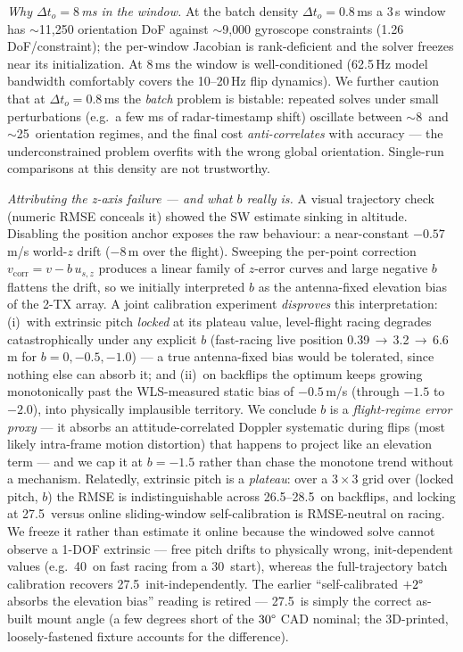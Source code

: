 \documentclass[conference]{IEEEtran}
\begin{document}
\emph{Why $\Delta t_o{=}8$\,ms in the window.}
At the batch density $\Delta t_o{=}0.8$\,ms a 3\,s window has
$\sim$11{,}250 orientation DoF against $\sim$9{,}000 gyroscope
constraints (1.26 DoF/constraint); the per-window Jacobian is
rank-deficient and the solver freezes near its initialization.
At 8\,ms the window is well-conditioned (62.5\,Hz model bandwidth
comfortably covers the 10--20\,Hz flip dynamics).
We further caution that at $\Delta t_o{=}0.8$\,ms the \emph{batch}
problem is bistable: repeated solves under small perturbations
(e.g.\ a few ms of radar-timestamp shift) oscillate between
$\sim$8\degree\ and $\sim$25\degree\ orientation regimes, and the
final cost \emph{anti-correlates} with accuracy --- the
underconstrained problem overfits with the wrong global orientation.
Single-run comparisons at this density are not trustworthy.

\emph{Attributing the z-axis failure --- and what $b$ really is.}
A visual trajectory check (numeric RMSE conceals it) showed the SW
estimate sinking in altitude.  Disabling the position anchor exposes
the raw behaviour: a near-constant $-0.57$\,m/s world-$z$ drift
($-8$\,m over the flight).  Sweeping the per-point correction
$v_{\mathrm{corr}} = v - b\,u_{s,z}$ produces a linear family of
$z$-error curves and large negative $b$ flattens the drift, so we
initially interpreted $b$ as the antenna-fixed elevation bias of the
2-TX array.  A joint calibration experiment \emph{disproves} this
interpretation: (i)~with extrinsic pitch \emph{locked} at its
plateau value, level-flight racing degrades catastrophically under
any explicit $b$ (fast-racing live position
0.39\,$\to$\,3.2\,$\to$\,6.6\,m for $b{=}0,-0.5,-1.0$) --- a true
antenna-fixed bias would be tolerated, since nothing else can absorb
it; and (ii)~on backflips the optimum keeps growing monotonically
past the WLS-measured static bias of $-0.5$\,m/s (through $-1.5$
to $-2.0$), into physically implausible territory.
We conclude $b$ is a \emph{flight-regime error proxy} --- it absorbs
an attitude-correlated Doppler systematic during flips (most likely
intra-frame motion distortion) that happens to project like an
elevation term --- and we cap it at $b{=}{-}1.5$ rather than chase
the monotone trend without a mechanism.
Relatedly, extrinsic pitch is a \emph{plateau}: over a $3{\times}3$ grid
over (locked pitch, $b$) the RMSE is indistinguishable across
26.5--28.5\degree\ on backflips, and locking at 27.5\degree\ versus
online sliding-window self-calibration is RMSE-neutral on racing.  We
freeze it rather than estimate it online because the windowed solve
cannot observe a 1-DOF extrinsic --- free pitch drifts to physically
wrong, init-dependent values (e.g.\ 40\degree\ on fast racing from a
30\degree\ start), whereas the full-trajectory batch calibration
recovers 27.5\degree\ init-independently.  The earlier
``self-calibrated $+2\degree$ absorbs the elevation bias'' reading is
retired --- 27.5\degree\ is simply the correct as-built mount angle (a
few degrees short of the $30\degree$ CAD nominal; the 3D-printed,
loosely-fastened fixture accounts for the difference).
\end{document}
